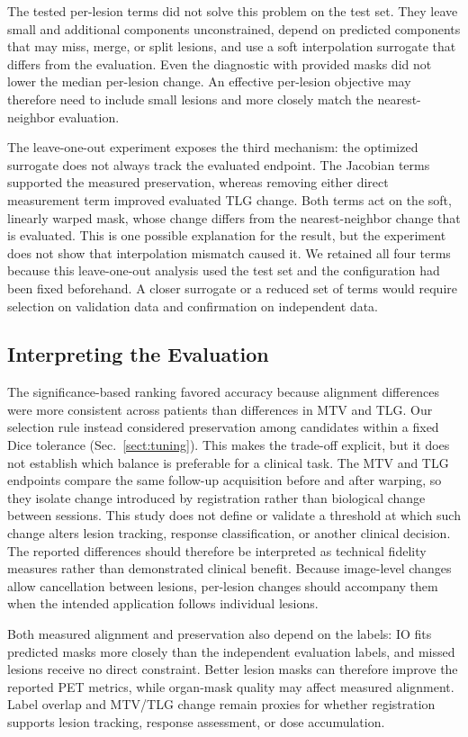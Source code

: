 The tested per-lesion terms did not solve this problem on the test set.
They leave small and additional components unconstrained, depend on predicted components that may miss, merge, or split lesions, and use a soft interpolation surrogate that differs from the evaluation.
Even the diagnostic with provided masks did not lower the median per-lesion change.
An effective per-lesion objective may therefore need to include small lesions and more closely match the nearest-neighbor evaluation.

The leave-one-out experiment exposes the third mechanism: the optimized surrogate does not always track the evaluated endpoint.
The Jacobian terms supported the measured preservation, whereas removing either direct measurement term improved evaluated TLG change.
Both terms act on the soft, linearly warped mask, whose change differs from the nearest-neighbor change that is evaluated.
This is one possible explanation for the result, but the experiment does not show that interpolation mismatch caused it.
We retained all four terms because this leave-one-out analysis used the test set and the configuration had been fixed beforehand.
A closer surrogate or a reduced set of terms would require selection on validation data and confirmation on independent data.

\subsection{Interpreting the Evaluation}
The significance-based ranking favored accuracy because alignment differences were more consistent across patients than differences in MTV and TLG.
Our selection rule instead considered preservation among candidates within a fixed Dice tolerance (Sec.~\ref{sect:tuning}).
This makes the trade-off explicit, but it does not establish which balance is preferable for a clinical task.
The MTV and TLG endpoints compare the same follow-up acquisition before and after warping, so they isolate change introduced by registration rather than biological change between sessions.
This study does not define or validate a threshold at which such change alters lesion tracking, response classification, or another clinical decision.
The reported differences should therefore be interpreted as technical fidelity measures rather than demonstrated clinical benefit.
Because image-level changes allow cancellation between lesions, per-lesion changes should accompany them when the intended application follows individual lesions.

Both measured alignment and preservation also depend on the labels: IO fits predicted masks more closely than the independent evaluation labels, and missed lesions receive no direct constraint.
Better lesion masks can therefore improve the reported PET metrics, while organ-mask quality may affect measured alignment.
Label overlap and MTV/TLG change remain proxies for whether registration supports lesion tracking, response assessment, or dose accumulation.

